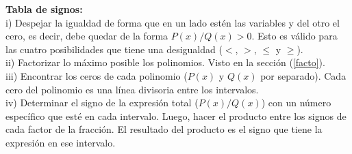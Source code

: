 \begin{mydef}
\textbf{Tabla de signos:}\\

\noindent i) Despejar la igualdad de forma que en un lado estén las variables y del otro el cero, es decir, debe quedar de la forma $P(x)/Q(x)>0$. Esto es válido para las cuatro posibilidades que tiene una desigualdad ($<$, $>$, $\leq$ y $\geq$). \\

\noindent ii) Factorizar lo máximo posible los polinomios. Visto en la sección (\ref{facto}). \\

\noindent iii) Encontrar los ceros de cada polinomio ($P(x)$ y $Q(x)$ por separado). Cada cero del polinomio es una línea divisoria entre los intervalos. \\

\noindent iv) Determinar el signo de la expresión total ($P(x)/Q(x)$) con un número específico que esté en cada intervalo. Luego, hacer el producto entre los signos de cada factor de la fracción. El resultado del producto es el signo que tiene la expresión en ese intervalo.\\
\end{mydef}
\newpage
